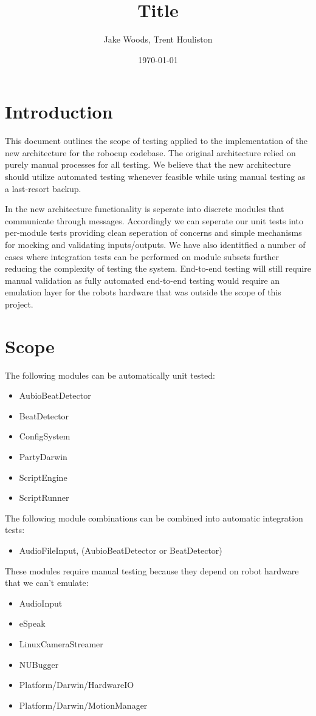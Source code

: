 \documentclass[a4paper]{article}
\title{Title}
\author{Jake Woods, Trent Houliston}
\date{\today}
\begin{document}
\maketitle

\section{Introduction}
	This document outlines the scope of testing applied to the implementation of the new architecture for the robocup codebase. 
	The original architecture relied on purely manual processes for all testing. 
	We believe that the new architecture should utilize automated testing whenever feasible while using manual testing as a last-resort backup.
	
	In the new architecture functionality is seperate into discrete modules that communicate through messages. 
	Accordingly we can seperate our unit tests into per-module tests providing clean seperation of concerns and simple mechanisms for mocking and validating inputs/outputs.
	We have also identitfied a number of cases where integration tests can be performed on module subsets further reducing the complexity of testing the system.
	End-to-end testing will still require manual validation as fully automated end-to-end testing would require an emulation layer for the robots hardware that was outside the scope of this project.

\section{Scope}
	The following modules can be automatically unit tested:
	\begin{itemize}
		\item AubioBeatDetector
		\item BeatDetector
		\item ConfigSystem
		\item PartyDarwin
		\item ScriptEngine
		\item ScriptRunner
	\end{itemize}

	The following module combinations can be combined into automatic integration tests:
	\begin{itemize}
		\item AudioFileInput, (AubioBeatDetector or BeatDetector)
	\end{itemize}

	These modules require manual testing because they depend on robot hardware that we can't emulate:
	\begin{itemize}
		\item AudioInput
		\item eSpeak
		\item LinuxCameraStreamer
		\item NUBugger
		\item Platform/Darwin/HardwareIO
		\item Platform/Darwin/MotionManager
	\end{itemize}
	
\end{document}
